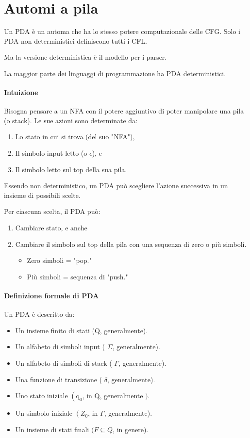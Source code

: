\chapter{Automi a pila}

Un PDA è un automa che ha lo stesso potere computazionale delle CFG.
Solo i PDA non deterministici definiscono tutti i CFL.

Ma la versione deterministica è il modello per i parser. 

La maggior parte dei linguaggi di programmazione ha PDA deterministici.

\subsubsection{Intuizione}

Bisogna pensare a un NFA con il potere aggiuntivo di poter manipolare una pila (o stack).
Le sue azioni sono determinate da:
\begin{enumerate}
    \item Lo stato in cui si trova (del suo "NFA"),
    \item Il simbolo input letto (o $\epsilon$), e
    \item Il simbolo letto sul top della sua pila.
\end{enumerate}
Essendo non deterministico, un PDA può scegliere l'azione successiva in un insieme di possibili scelte.

Per ciascuna scelta, il PDA può:
\begin{enumerate}
    \item Cambiare stato, e anche
    \item Cambiare il simbolo sul top della pila con una sequenza di zero o più simboli.
    \begin{itemize}
        \item Zero simboli = "pop."
        \item Più simboli = sequenza di "push."
    \end{itemize}
\end{enumerate}

\subsubsection{Definizione formale di PDA}
Un PDA è descritto da:
\begin{itemize}
    \item Un insieme finito di stati (Q, generalmente).
    \item Un alfabeto di simboli input ( $\Sigma$, generalmente).
    \item Un alfabeto di simboli di stack ( $\Gamma$, generalmente).
    \item Una funzione di transizione ( $\delta$, generalmente).
    \item  Uno stato iniziale $\left(\mathrm{q}_{0}\right.$, in $\mathrm{Q}$, generalmente $)$.
    \item Un simbolo iniziale $\left(Z_{0}\right.$, in $\Gamma$, generalmente).
    \item Un insieme di stati finali $(F \subseteq Q$, in genere).
\end{itemize}

